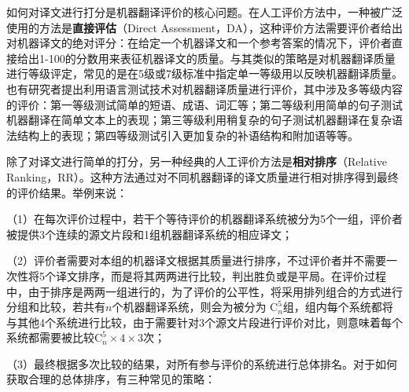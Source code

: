 \parinterval 如何对译文进行打分是机器翻译评价的核心问题。在人工评价方法中，一种被广泛使用的方法是{\small\sffamily\bfseries{直接评估}}（Direct Assessment，DA），这种评价方法需要评价者给出对机器译文的绝对评分：在给定一个机器译文和一个参考答案的情况下，评价者直接给出1-100的分数用来表征机器译文的质量。与其类似的策略是对机器翻译质量进行等级评定，常见的是在5级或7级标准中指定单一等级用以反映机器翻译质量。也有研究者提出利用语言测试技术对机器翻译质量进行评价，其中涉及多等级内容的评价：第一等级测试简单的短语、成语、词汇等；第二等级利用简单的句子测试机器翻译在简单文本上的表现；第三等级利用稍复杂的句子测试机器翻译在复杂语法结构上的表现；第四等级测试引入更加复杂的补语结构和附加语等等。

\parinterval 除了对译文进行简单的打分，另一种经典的人工评价方法是{\small\sffamily\bfseries{相对排序}}（Relative Ranking，RR）。这种方法通过对不同机器翻译的译文质量进行相对排序得到最终的评价结果。举例来说：

\parinterval （1）在每次评价过程中，若干个等待评价的机器翻译系统被分为5个一组，评价者被提供3个连续的源文片段和1组机器翻译系统的相应译文；

\parinterval （2）评价者需要对本组的机器译文根据其质量进行排序，不过评价者并不需要一次性将5个译文排序，而是将其两两进行比较，判出胜负或是平局。在评价过程中，由于排序是两两一组进行的，为了评价的公平性，将采用排列组合的方式进行分组和比较，若共有$n$个机器翻译系统，则会为被分为 $\textrm{C}_n^5$组，组内每个系统都将与其他4个系统进行比较，由于需要针对3个源文片段进行评价对比，则意味着每个系统都需要被比较$\textrm{C}_n^5 \times 4 \times 3$次；

\parinterval （3）最终根据多次比较的结果，对所有参与评价的系统进行总体排名。对于如何获取合理的总体排序，有三种常见的策略：

